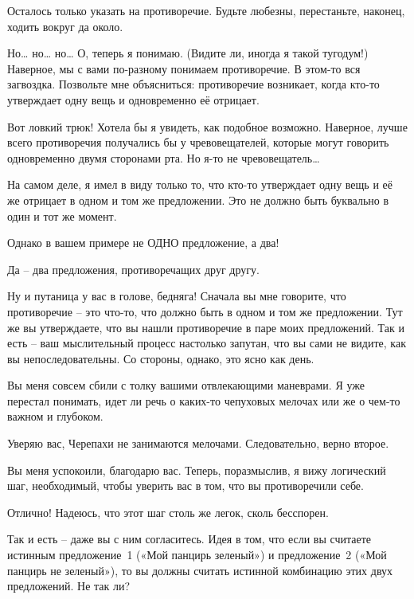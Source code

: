 \documentclass[../main.tex]{subfiles}
\begin{document}
\begin{Dialogue}
 Осталось только указать на противоречие. Будьте любезны, перестаньте, наконец, ходить вокруг да около.

 Но\ldots{} но\ldots{} но\ldots{} О, теперь я понимаю. (Видите ли, иногда я такой тугодум!) Наверное, мы с вами по-разному понимаем противоречие. В этом-то вся загвоздка. Позвольте мне объясниться: противоречие возникает, когда кто-то утверждает одну вещь и одновременно её отрицает.

 Вот ловкий трюк! Хотела бы я увидеть, как подобное возможно. Наверное, лучше всего противоречия получались бы у чревовещателей, которые могут говорить одновременно двумя сторонами рта. Но я-то не чревовещатель\ldots{}

 На самом деле, я имел в виду только то, что кто-то утверждает одну вещь и её же отрицает в одном и том же предложении. Это не должно быть буквально в один и тот же момент.

 Однако в вашем примере не ОДНО предложение, а два!

 Да \--- два предложения, противоречащих друг другу.

 Ну и путаница у вас в голове, бедняга! Сначала вы мне говорите, что противоречие \--- это что-то, что должно быть в одном и том же предложении. Тут же вы утверждаете, что вы нашли противоречие в паре моих предложений. Так и есть \--- ваш мыслительный процесс настолько запутан, что вы сами не видите, как вы непоследовательны. Со стороны, однако, это ясно как день.

 Вы меня совсем сбили с толку вашими отвлекающими маневрами. Я уже перестал понимать, идет ли речь о каких-то чепуховых мелочах или же о чем-то важном и глубоком.

 Уверяю вас, Черепахи не занимаются мелочами. Следовательно, верно второе.

 Вы меня успокоили, благодарю вас. Теперь, поразмыслив, я вижу логический шаг, необходимый, чтобы уверить вас в том, что вы противоречили себе.

 Отлично! Надеюсь, что этот шаг столь же легок, сколь бесспорен.

 Так и есть \--- даже вы с ним согласитесь. Идея в том, что если вы считаете истинным предложение~1 («Мой панцирь зеленый») и предложение~2 («Мой панцирь не зеленый»), то вы должны считать истинной комбинацию этих двух предложений. Не так ли?


\end{Dialogue}
\end{document}

